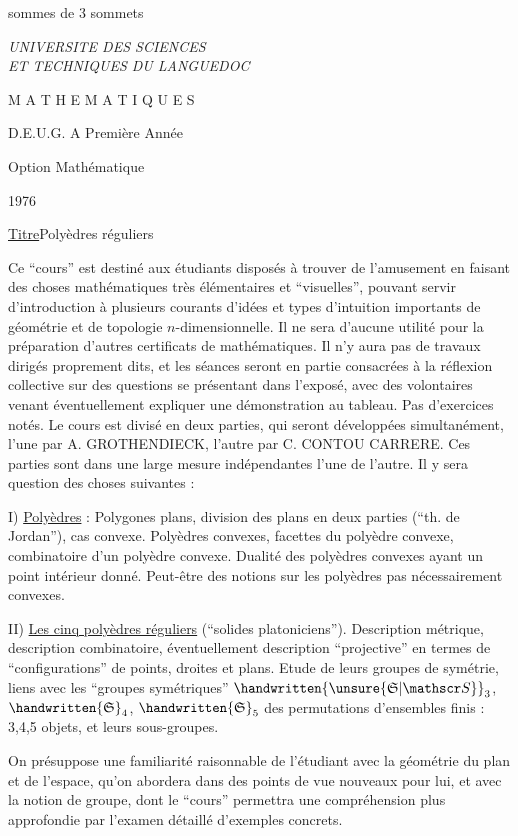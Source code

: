 sommes de 3 sommets
{\itshape
UNIVERSITE DES SCIENCES\\
ET TECHNIQUES DU LANGUEDOC

M A T H E M A T I Q U E S

D.E.U.G. A Première Année

Option Mathématique

1976

\uline{Titre}\qquad Polyèdres réguliers

Ce ``cours'' est destiné aux étudiants disposés à trouver de l'amusement en faisant des choses mathématiques très élémentaires et ``visuelles'', pouvant servir d'introduction à plusieurs courants d'idées et types d'intuition importants de géométrie et de topologie $n$-dimensionnelle. Il ne sera d'aucune utilité pour la préparation d'autres certificats de mathématiques. Il n'y aura pas de travaux dirigés proprement dits, et les séances seront en partie consacrées à la réflexion collective sur des questions se présentant dans l'exposé, avec des volontaires venant éventuellement expliquer une démonstration au tableau. Pas d'exercices notés. Le cours est divisé en deux parties, qui seront développées simultanément, l'une par A. GROTHENDIECK, l'autre par C. CONTOU CARRERE. Ces parties sont dans une large mesure indépendantes l'une de l'autre. Il y sera question des choses suivantes :

I) \uline{Polyèdres} : Polygones plans, division des plans en deux parties (``th. de Jordan''), cas convexe. Polyèdres convexes, facettes du polyèdre convexe, combinatoire d'un polyèdre convexe. Dualité des polyèdres convexes ayant un point intérieur donné. Peut-être des notions sur les polyèdres pas nécessairement convexes.

II) \uline{Les cinq polyèdres réguliers} (``solides platoniciens''). Description métrique, description combinatoire, éventuellement description ``projective'' en termes de ``configurations'' de points, droites et plans. Etude de leurs groupes de symétrie, liens avec les ``groupes symétriques'' $\handwritten{\unsure{\mathfrak S|\mathscr S}}_3$, $\handwritten{\mathfrak S}_4$, $\handwritten{\mathfrak S}_5$ des permutations d'ensembles finis : 3,4,5 objets, et leurs sous-groupes.

On présuppose une familiarité raisonnable de l'étudiant avec la géométrie du plan et de l'espace, qu'on abordera dans des points de vue nouveaux pour lui, et avec la notion de groupe, dont le ``cours'' permettra une compréhension plus approfondie par l'examen détaillé d'exemples concrets.
}
